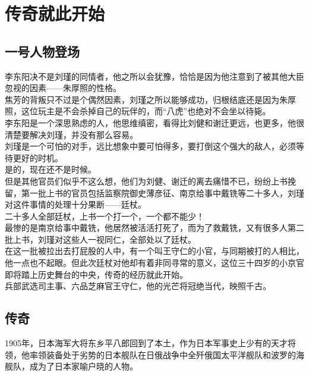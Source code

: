 \section{传奇就此开始}
\ifnum{}
	\begin{multicols}{\theparacolNo}
\fi
\subsection{一号人物登场}
李东阳决不是刘瑾的同情者，他之所以会犹豫，恰恰是因为他注意到了被其他大臣忽视的因素——朱厚照的性格。\\

焦芳的背叛只不过是个偶然因素，刘瑾之所以能够成功，归根结底还是因为朱厚照，这位玩主是不会杀掉自己的玩伴的，而“八虎”也绝对不会坐以待毙。\\

李东阳是一个深思熟虑的人，他思维缜密，看得比刘健和谢迁更远，也更多，他很清楚要解决刘瑾，并没有那么容易。\\

刘瑾是一个可怕的对手，远比想象中要可怕得多，要打倒这个强大的敌人，必须等待更好的时机。\\

是的，现在还不是时候。\\

但是其他官员们似乎不这么想，他们为刘健、谢迁的离去痛惜不已，纷纷上书挽留，第一批上书的官员包括监察院御史薄彦征、南京给事中戴铣等二十多人，刘瑾对这件事情的处理十分果断——廷杖。\\

二十多人全部廷杖，上书一个打一个，一个都不能少！\\

最惨的是南京给事中戴铣，他居然被活活打死了，而为了救戴铣，又有很多人第二批上书，刘瑾对这些人一视同仁，全部处以了廷杖。\\

在这一批被拉出去打屁股的人中，有一个叫王守仁的小官，与同期被打的人相比，他一点也不起眼。但此次廷杖对他却有着非同寻常的意义，这位三十四岁的小京官即将踏上历史舞台的中央，传奇的经历就此开始。\\

兵部武选司主事、六品芝麻官王守仁，他的光芒将冠绝当代，映照千古。\\

\subsection{传奇}
1905年，日本海军大将东乡平八郎回到了本土，作为日本军事史上少有的天才将领，他率领装备处于劣势的日本舰队在日俄战争中全歼俄国太平洋舰队和波罗的海舰队，成为了日本家喻户晓的人物。\\


\end{multicols}
